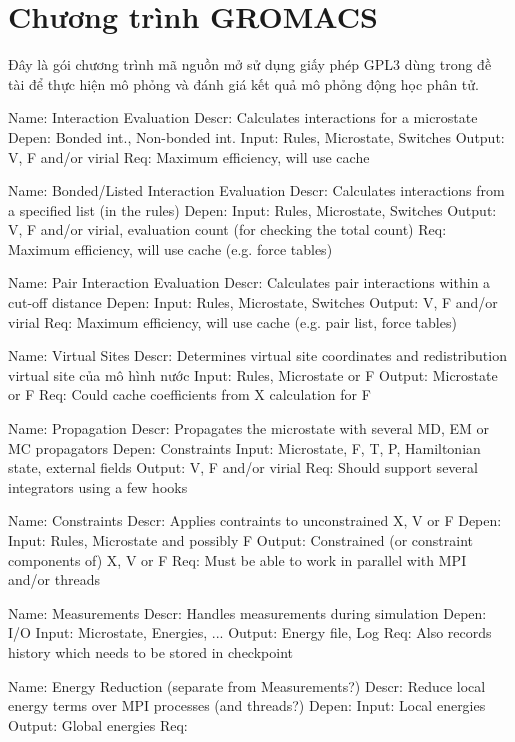 \chapter{Chương trình GROMACS}
Đây là gói chương trình mã nguồn mở sử dụng giấy phép GPL3 dùng trong đề tài để thực hiện mô phỏng và đánh giá kết quả mô phỏng động học phân tử.

Name:    Interaction Evaluation
Descr:   Calculates interactions for a microstate
Depen:   Bonded int., Non-bonded int.
Input:   Rules, Microstate, Switches
Output:  V, F and/or virial
Req:     Maximum efficiency, will use cache
 
Name:    Bonded/Listed Interaction Evaluation
Descr:   Calculates interactions from a specified list (in the rules)
Depen:  
Input:   Rules, Microstate, Switches
Output:  V, F and/or virial, evaluation count (for checking the total count)
Req:     Maximum efficiency, will use cache (e.g. force tables)
 
Name:    Pair Interaction Evaluation
Descr:   Calculates pair interactions within a cut-off distance
Depen:  
Input:   Rules, Microstate, Switches
Output:  V, F and/or virial
Req:     Maximum efficiency, will use cache (e.g. pair list, force tables)
 
Name:    Virtual Sites
Descr:   Determines virtual site coordinates and redistribution
virtual site của mô hình nước
Input:   Rules, Microstate or F
Output:  Microstate or F
Req:     Could cache coefficients from X calculation for F
 
Name:    Propagation
Descr:   Propagates the microstate with several MD, EM or MC propagators
Depen:   Constraints
Input:   Microstate, F, T, P, Hamiltonian state, external fields
Output:  V, F and/or virial
Req:     Should support several integrators using a few hooks
 
Name:    Constraints
Descr:   Applies contraints to unconstrained X, V or F
Depen:  
Input:   Rules, Microstate and possibly F
Output:  Constrained (or constraint components of) X, V or F
Req:     Must be able to work in parallel with MPI and/or threads
 
Name:    Measurements
Descr:   Handles measurements during simulation
Depen:   I/O
Input:   Microstate, Energies, ...
Output:  Energy file, Log
Req:     Also records history which needs to be stored in checkpoint
 
Name:    Energy Reduction (separate from Measurements?)
Descr:   Reduce local energy terms over MPI processes (and threads?)
Depen:  
Input:   Local energies
Output:  Global energies
Req:    
 
